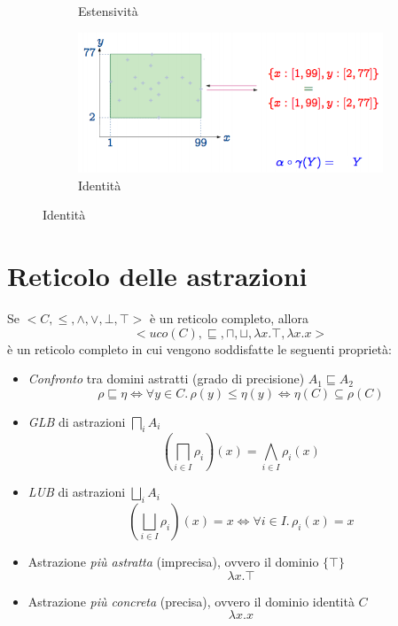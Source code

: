 \documentclass[a4paper,oneside,titlepage]{book}
\begin{document}
\begin{figure}[htp]
\begin{subfigure}{0.49\textwidth}
		\caption{Estensività}
	\end{subfigure}
	\hfill
	\begin{subfigure}{0.49\textwidth}
	    \centering
		\includegraphics[width=\textwidth, height=\textheight, keepaspectratio]{esId.png} 
		\caption{Identità}
	\end{subfigure}
\end{figure}


\section{Reticolo delle astrazioni} %
Se $< C, \leq, \wedge, \vee, \bot, \top >$ è un reticolo completo, allora
\[
    < uco(C), \sqsubseteq, \sqcap, \sqcup, \lambda x.\top, \lambda x.x >
\]
è un reticolo completo in cui vengono soddisfatte le seguenti proprietà:
\begin{itemize}
	\item \textit{Confronto} tra domini astratti (grado di precisione) $A_1 \sqsubseteq A_2$
	\[
	    \rho \sqsubseteq \eta \Leftrightarrow \forall y \in C. \, \rho(y) \leq \eta(y) \Leftrightarrow \eta(C) \subseteq \rho(C)
	\]
	\item \textit{GLB} di astrazioni $\bigsqcap_i A_i$
	\[
	    \left( \bigsqcap_{i \in I} \rho_i \right) (x) = \bigwedge_{i \in I} \rho_i (x)
    \]
	\item \textit{LUB} di astrazioni $\bigsqcup_i A_i$
	\[
        \left( \bigsqcup_{i \in I} \rho_i \right) (x) = x \Leftrightarrow \forall i \in I. \, \rho_i (x) = x
    \]
	\item Astrazione \textit{più astratta} (imprecisa), ovvero il dominio $\{ \top \}$
	\[
	    \lambda x.\top
    \]
	\item Astrazione \textit{più concreta} (precisa), ovvero il dominio identità $C$
	\[
	    \lambda x.x
    \]
\end{itemize}
\end{document}
